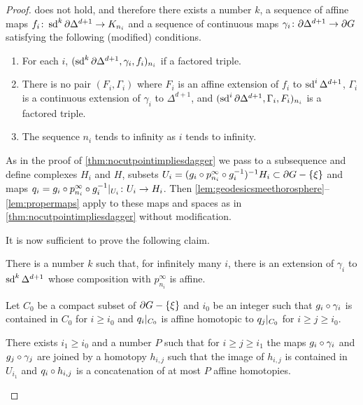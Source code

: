 \documentclass[a4paper]{article}
\begin{document}
\begin{proof}

does not hold, and therefore there exists a number $k$, a sequence of affine 
maps $f_i\colon \operatorname{sd}^k\partial\Delta^{d+1}\to K_{n_i}$ and a sequence of 
continuous maps $\gamma_i\colon \partial\Delta^{d+1}\to\partial G$ satisfying 
the following (modified) conditions.
\begin{enumerate}
  \item For each $i$, $(\operatorname{sd}^k\partial\Delta^{d+1},\gamma_i,f_i)_{n_i}$ if a 
    factored triple.
  \item There is no pair $(F_i, \Gamma_i)$ where $F_i$ is an affine extension of 
    $f_i$ to $\operatorname{sd}^i\Delta^{d+1}$, $\Gamma_i$ is a continuous extension of 
    $\gamma_i$ to $\Delta^{d+1}$, and 
    $(\operatorname{sd}^i\partial\Delta^{d+1},\Gamma_i,F_i)_{n_i}$ is a factored triple.
  \item The sequence $n_i$ tends to infinity as $i$ tends to infinity.
\end{enumerate}

As in the proof of \cref{thm:nocutpointimpliesdagger} we pass to a 
subsequence and define complexes $H_i$ and $H$, subsets $U_i = (g_i\circ 
p^\infty_{n_i}\circ g_i^{-1})^{-1} H_i\subset \partial G 
- \left\{\xi\right\}$ and maps $q_i = g_i\circ p^\infty_{n_i}\circ 
g_i^{-1}\vert_{U_i}\colon U_i\to H_i$. Then 
\cref{lem:geodesicsmeethorosphere}--\ref{lem:propermaps} apply to these maps
and spaces as in \cref{thm:nocutpointimpliesdagger} without modification.

It is now sufficient to prove the following claim.

\begin{claim} 
  There is a number $k$ such that, for infinitely many $i$, there is an 
  extension of $\gamma_i$ to $\operatorname{sd}^k\Delta^{d+1}$ whose composition with 
  $p^\infty_{n_i}$ is affine.
\end{claim}

Let $C_0$ be a compact subset of $\partial G - \left\{\xi\right\}$ and $i_0$ be an
integer such that $g_i\circ\gamma_i$ is contained in $C_0$ for $i\geq i_0$
and $q_i\vert_{C_0}$ is affine homotopic to $q_j\vert_{C_0}$ for
$i\geq j\geq i_0$. 

\begin{lemma}
  There exists $i_1\geq i_0$ and a number $P$ such that for $i\geq j\geq i_1$ 
  the maps $g_i\circ \gamma_i$ and $g_j\circ\gamma_j$ are joined by a 
  homotopy $h_{i,j}$ such that the image of $h_{i,j}$ is contained in $U_{i_1}$ 
  and  $q_i\circ h_{i,j}$ is a concatenation of at most $P$ affine 
  homotopies.
\end{lemma}


\end{proof}
\end{document}
